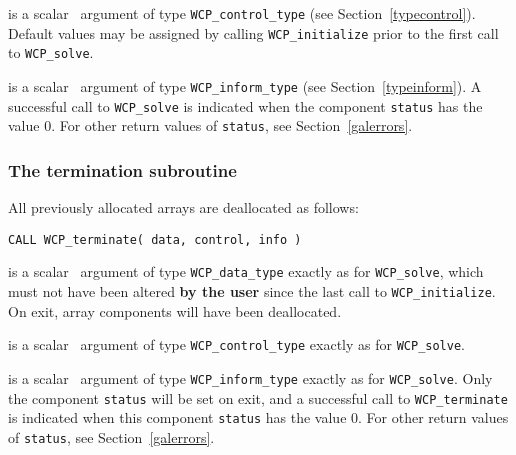 \documentclass{galahad}
\newcommand{\packagename}{WCP}
\begin{document}
\begin{description}
 is a scalar \intentin\ argument of type 
{\tt \packagename\_control\_type}
(see Section~\ref{typecontrol}). Default values may be assigned by calling 
{\tt \packagename\_initialize} prior to the first call to 
{\tt \packagename\_solve}.

 is a scalar \intentout\ argument of type 
{\tt \packagename\_inform\_type}
(see Section~\ref{typeinform}). A successful call to
{\tt \packagename\_solve}
is indicated when the  component {\tt status} has the value 0. 
For other return values of {\tt status}, see Section~\ref{galerrors}.


\end{description}


\subsubsection{The  termination subroutine}
All previously allocated arrays are deallocated as follows:
\vspace*{1mm}

\hspace{8mm}
{\tt CALL \packagename\_terminate( data, control, info )}

\vspace*{-3mm}
\begin{description}

 is a scalar \intentinout\ argument of type 
{\tt \packagename\_data\_type} 
exactly as for
{\tt \packagename\_solve},
which must not have been altered {\bf by the user} since the last call to 
{\tt \packagename\_initialize}.
On exit, array components will have been deallocated.

 is a scalar \intentin\ argument of type 
{\tt \packagename\_control\_type}
exactly as for
{\tt \packagename\_solve}.

 is a scalar \intentout\ argument of type
{\tt \packagename\_inform\_type}
exactly as for
{\tt \packagename\_solve}.
Only the component {\tt status} will be set on exit, and a 
successful call to 
{\tt \packagename\_terminate}
is indicated when this  component {\tt status} has the value 0. 
For other return values of {\tt status}, see Section~\ref{galerrors}.

\end{description}
\end{document}
